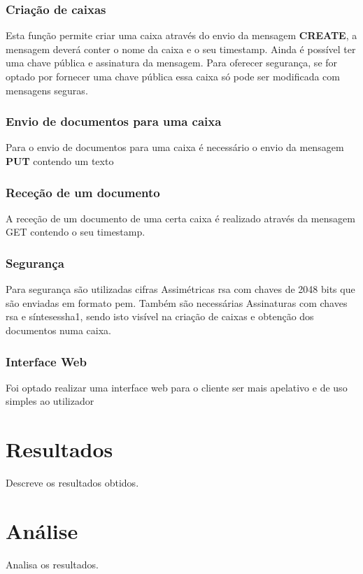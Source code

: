 \documentclass{report}
\begin{document}
\subsection{Criação de caixas}
Esta função permite criar uma caixa através do envio da mensagem \textbf{CREATE}, a mensagem deverá conter o nome da caixa e o seu timestamp. Ainda é possível ter uma chave pública e assinatura da mensagem. Para oferecer segurança, se for optado por fornecer uma chave pública essa caixa só pode ser modificada com mensagens seguras.


\subsection{Envio de documentos para uma caixa}
Para o envio de documentos para uma caixa é necessário o envio da mensagem \textbf{PUT} contendo um texto


\subsection{Receção de um documento}
A receção de um documento de uma certa caixa é realizado através da mensagem GET contendo o seu timestamp.


\subsection{Segurança}
Para segurança são utilizadas cifras Assimétricas \ac{rsa} com chaves de 2048 bits que são enviadas em formato \ac{pem}. Também são necessárias Assinaturas com chaves \ac{rsa} e sínteses{sha1}, sendo isto visível na criação de caixas e obtenção dos documentos numa caixa.

\subsection{Interface Web}
Foi optado realizar uma interface web para o cliente ser mais apelativo e de uso simples ao utilizador

\chapter{Resultados}
\label{chap.resultados}
Descreve os resultados obtidos.

\chapter{Análise}
\label{chap.analise}
Analisa os resultados.
\end{document}

